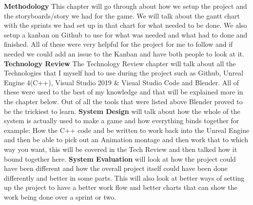 \textbf{Methodology}
This chapter will go through about how we setup the project and the storyboards/story we had for the game. We will talk about the gantt chart with the sprints we had set up in that chart for what needed to be done. We also setup a kanban on Github to use for what was needed and what had to done and finished. All of these were very helpful for the project for me to follow and if needed we could add an issue to the Kanban and have both people to look at it.
\newline
\newline
\textbf{Technology Review} 
The Technology Review chapter will talk about all the Technologies that I myself had to use during the project such as Github, Unreal Engine 4(C++), Visual Studio 2019 \& Visual Studio Code and Blender. All of these were used to the best of my knowledge and that will be explained more in the chapter below. Out of all the tools that were listed above Blender proved to be the trickiest to learn.
\newline
\newline
\textbf{System Design}
will talk about how the whole of the system is actually used to make a game and how everything binds together for example: How the C++ code and be written to work back into the Unreal Engine and then be able to pick out an Animation montage and then work that to which way you want, this will be covered in the Tech Review and then talked how it bound together here.
\newline
\newline
\textbf{System Evaluation}
will look at how the project could have been different and how the overall project itself could have been done differently and better in some parts. This will also look at better ways of setting up the project to have a better work flow and better charts that can show the work being done over a sprint or two.
